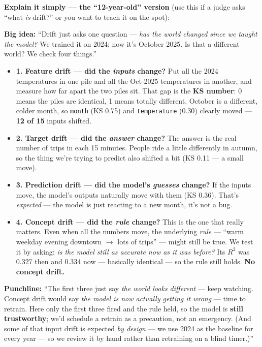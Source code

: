 \documentclass[11pt]{article}
\newcommand{\Rtwo}{$R^2$}
\begin{document}
\smallskip
\noindent\textbf{\color{blue}Explain it simply --- the ``12-year-old'' version} (use this if a judge asks
``what \emph{is} drift?'' or you want to teach it on the spot):
\begin{simple}
\textbf{Big idea:} ``Drift just asks one question --- \emph{has the world changed since we taught the
model?} We trained it on 2024; now it's October 2025. Is that a different world? We check four things.''
\begin{itemize}[leftmargin=1.4em, itemsep=3pt]
  \item \textbf{1. Feature drift --- did the \emph{inputs} change?} Put all the 2024 temperatures in one
        pile and all the Oct-2025 temperatures in another, and measure how far apart the two piles sit.
        That gap is the \textbf{KS number}: 0 means the piles are identical, 1 means totally different.
        October is a different, colder month, so \texttt{month} (KS 0.75) and \texttt{temperature} (0.30)
        clearly moved --- \textbf{12 of 15} inputs shifted.
  \item \textbf{2. Target drift --- did the \emph{answer} change?} The answer is the real number of trips
        in each 15 minutes. People ride a little differently in autumn, so the thing we're trying to
        predict also shifted a bit (KS 0.11 --- a small move).
  \item \textbf{3. Prediction drift --- did the model's \emph{guesses} change?} If the inputs move, the
        model's outputs naturally move with them (KS 0.36). That's \emph{expected} --- the model is just
        reacting to a new month, it's not a bug.
  \item \textbf{4. Concept drift --- did the \emph{rule} change?} This is the one that really matters. Even
        when all the numbers move, the underlying \emph{rule} --- ``warm weekday evening downtown
        $\to$ lots of trips'' --- might still be true. We test it by asking: \emph{is the model still as
        accurate now as it was before?} Its \Rtwo{} was 0.327 then and 0.334 now --- basically identical
        --- so the rule still holds. \textbf{No concept drift.}
\end{itemize}
\textbf{Punchline:} ``The first three just say \emph{the world looks different} --- keep watching.
Concept drift would say \emph{the model is now actually getting it wrong} --- time to retrain. Here only
the first three fired and the rule held, so the model is \textbf{still trustworthy}; we'd schedule a
retrain as a precaution, not an emergency. (And some of that input drift is expected \emph{by design} ---
we use 2024 as the baseline for every year --- so we review it by hand rather than retraining on a blind
timer.)''
\end{simple}
\end{document}
